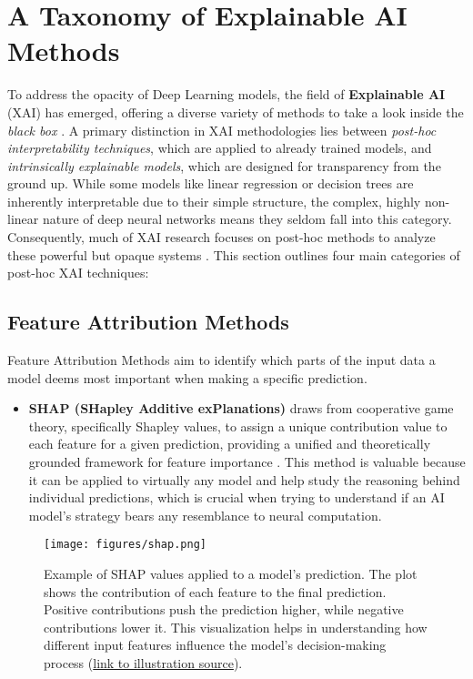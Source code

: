 \section{A Taxonomy of Explainable AI Methods}\label{sec:XAI-tax}

To address the opacity of Deep Learning models, the field of \textbf{Explainable AI} (XAI) has emerged, offering a diverse variety of methods to take a look inside the \textit{black box} \cite{doshi2017towards, miller2019explanation}. A primary distinction in XAI methodologies lies between \textit{post-hoc interpretability techniques}, which are applied to already trained models, and \textit{intrinsically explainable models}, which are designed for transparency from the ground up. While some models like linear regression or decision trees are inherently interpretable due to their simple structure, the complex, highly non-linear nature of deep neural networks means they seldom fall into this category. Consequently, much of XAI research focuses on post-hoc methods to analyze these powerful but opaque systems \cite{doshi2017towards}. This section outlines four main categories of post-hoc XAI techniques:

\subsection{Feature Attribution Methods}
Feature Attribution Methods aim to identify which parts of the input data a model deems most important when making a specific prediction.
\begin{itemize}
    \item \textbf{SHAP (SHapley Additive exPlanations)} draws from cooperative game theory, specifically Shapley values, to assign a unique contribution value to each feature for a given prediction, providing a unified and theoretically grounded framework for feature importance \cite{lundberg2017unified}. This method is valuable because it can be applied to virtually any model and help study the reasoning behind individual predictions, which is crucial when trying to understand if an AI model's strategy bears any resemblance to neural computation.
\end{itemize}

\begin{figure}[h!]
    \centering
    \texttt{[image: figures/shap.png]}
    \caption{Example of SHAP values applied to a model's prediction. The plot shows the contribution of each feature to the final prediction. Positive contributions push the prediction higher, while negative contributions lower it. This visualization helps in understanding how different input features influence the model's decision-making process (\href{https://shap.readthedocs.io/}{link to illustration source}).}
    \label{fig:shap_example}
\end{figure}

